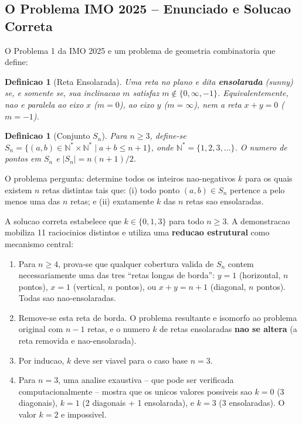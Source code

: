 \documentclass[5p]{elsarticle}
\newtheorem{definition}[theorem]{Definicao}
\newcommand{\N}{\mathbb{N}}\newcommand{\Z}{\mathbb{Z}}\newcommand{\R}{\mathbb{R}}
\begin{document}
\subsection{O Problema IMO 2025 -- Enunciado e Solucao Correta}

O Problema 1 da IMO 2025 \cite{imo2025} e um problema de geometria combinatoria
que define:

\begin{definition}[Reta Ensolarada]
 Uma reta no plano e dita \textbf{ensolarada} (\textit{sunny}) se, e somente se,
 sua inclinacao $m$ satisfaz $m\notin\{0,\infty,-1\}$. Equivalentemente, nao e
 paralela ao eixo $x$ ($m=0$), ao eixo $y$ ($m=\infty$), nem a reta $x+y=0$
 ($m=-1$).
\end{definition}

\begin{definition}[Conjunto $S_n$]
 Para $n\geq 3$, define-se $S_n = \{(a,b)\in\N^*\times\N^* \mid a+b\leq n+1\}$,
 onde $\N^*=\{1,2,3,\dots\}$. O numero de pontos em $S_n$ e $|S_n|=n(n+1)/2$.
\end{definition}

O problema pergunta: determine todos os inteiros nao-negativos $k$ para os quais
existem $n$ retas distintas tais que: (i) todo ponto $(a,b)\in S_n$ pertence a
pelo menos uma das $n$ retas; e (ii) exatamente $k$ das $n$ retas sao ensolaradas.

A solucao correta \cite{chen2025,deepmind2025} estabelece que $k\in\{0,1,3\}$ para
todo $n\geq 3$. A demonstracao mobiliza 11 raciocinios distintos e utiliza uma
\textbf{reducao estrutural} como mecanismo central:

\begin{enumerate}[label=(\roman*)]
 \item Para $n\geq 4$, prova-se que qualquer cobertura valida de $S_n$ contem
 necessariamente uma das tres ``retas longas de borda'': $y=1$ (horizontal,
 $n$ pontos), $x=1$ (vertical, $n$ pontos), ou $x+y=n+1$ (diagonal, $n$
 pontos). Todas sao nao-ensolaradas.
 \item Remove-se esta reta de borda. O problema resultante e isomorfo ao problema
 original com $n-1$ retas, e o numero $k$ de retas ensolaradas \textbf{nao se
 altera} (a reta removida e nao-ensolarada).
 \item Por inducao, $k$ deve ser viavel para o caso base $n=3$.
 \item Para $n=3$, uma analise exaustiva -- que pode ser verificada
 computacionalmente -- mostra que os unicos valores possiveis sao $k=0$
 (3 diagonais), $k=1$ (2 diagonais + 1 ensolarada), e $k=3$ (3 ensolaradas).
 O valor $k=2$ e impossivel.
\end{enumerate}
\end{document}
